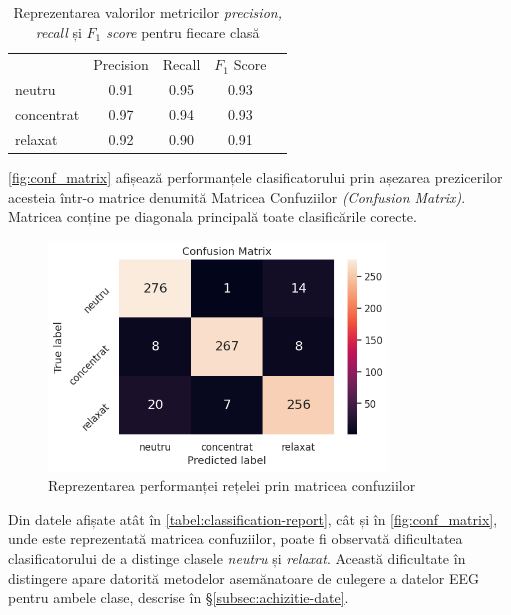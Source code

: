 \begin{table}[ht]
\centering
\caption{Reprezentarea valorilor metricilor \textit{precision, recall} și \textit{$F_1$ score} pentru fiecare clasă}
\label{tabel:classification-report}
\renewcommand{\arraystretch}{1.2}
\begin{tabular}{@{}lcccc@{}}
\rowcolor{gray!50}\cellcolor{white} & Precision & Recall & $F_1$ Score \\ %
neutru & 0.91 & 0.95 & 0.93 \\
concentrat & 0.97 & 0.94 & 0.93 \\
relaxat & 0.92 & 0.90 & 0.91 \\ \bottomrule
\end{tabular}
\end{table}

\autoref{fig:conf_matrix} afișează performanțele clasificatorului prin așezarea prezicerilor acesteia într-o matrice denumită Matricea Confuziilor \textit{(Confusion Matrix)}. Matricea conține pe diagonala principală toate clasificările corecte.

\begin{figure}[H]
\centering
\includegraphics[width=9cm, keepaspectratio]{fig/cap3/conf_matrix.png}
\caption{Reprezentarea performanței rețelei prin matricea confuziilor}\label{fig:conf_matrix}
\end{figure}

Din datele afișate atât în \autoref{tabel:classification-report}, cât și în \autoref{fig:conf_matrix}, unde este reprezentată matricea confuziilor, poate fi observată dificultatea clasificatorului de a distinge clasele \textit{neutru} și \textit{relaxat}. Această dificultate în distingere apare datorită metodelor asemănatoare de culegere a datelor EEG pentru ambele clase, descrise în \S\ref{subsec:achizitie-date}. 
